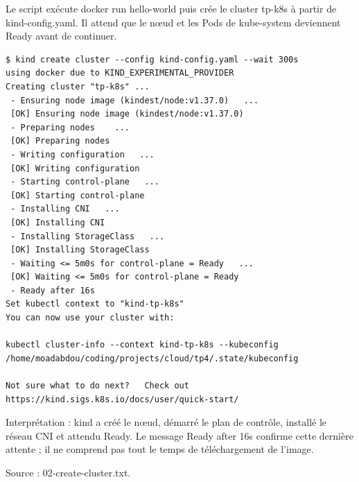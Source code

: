 \documentclass[11pt,a4paper]{article}
\begin{document}
Le script exécute docker run hello-world puis crée le cluster tp-k8s à partir de kind-config.yaml.
Il attend que le nœud et les Pods de kube-system deviennent Ready avant de continuer.

\par\medskip\noindent\begin{minipage}{\linewidth}
\par\vspace{4pt}\noindent\begin{minipage}{\linewidth}
\begin{Verbatim}[breaklines=true,breakanywhere=true,fontsize=\footnotesize,frame=single,framesep=8pt,rulecolor=\color{teal}]
$ kind create cluster --config kind-config.yaml --wait 300s
using docker due to KIND_EXPERIMENTAL_PROVIDER
Creating cluster "tp-k8s" ...
 - Ensuring node image (kindest/node:v1.37.0)   ...
 [OK] Ensuring node image (kindest/node:v1.37.0) 
 - Preparing nodes    ...
 [OK] Preparing nodes  
 - Writing configuration   ...
 [OK] Writing configuration 
 - Starting control-plane   ...
 [OK] Starting control-plane 
 - Installing CNI   ...
 [OK] Installing CNI 
 - Installing StorageClass   ...
 [OK] Installing StorageClass 
 - Waiting <= 5m0s for control-plane = Ready   ...
 [OK] Waiting <= 5m0s for control-plane = Ready 
 - Ready after 16s 
Set kubectl context to "kind-tp-k8s"
You can now use your cluster with:

kubectl cluster-info --context kind-tp-k8s --kubeconfig /home/moadabdou/coding/projects/cloud/tp4/.state/kubeconfig

Not sure what to do next?   Check out https://kind.sigs.k8s.io/docs/user/quick-start/
\end{Verbatim}
\end{minipage}\par\vspace{6pt}

Interprétation : kind a créé le nœud, démarré le plan de contrôle, installé le réseau CNI et attendu Ready. Le message Ready after 16s confirme cette dernière attente ; il ne comprend pas tout le temps de téléchargement de l'image.

{\footnotesize\color{teal} Source : 02-create-cluster.txt.\par}
\end{minipage}\par\medskip
\end{document}

